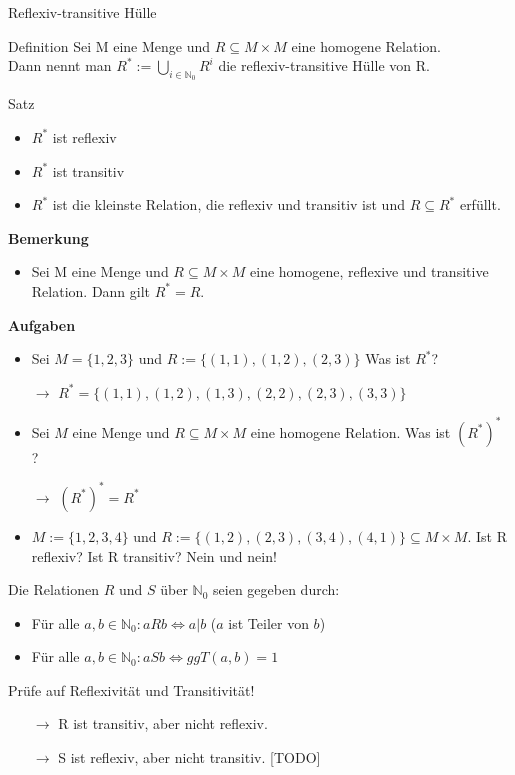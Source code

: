 \begin{frame}{Reflexiv-transitive Hülle}
	\bp\begin{block}{Definition}
		Sei M eine Menge und $R \subseteq M \times M$ eine homogene Relation. \\Dann nennt man $R^* := \bigcup\limits_{i \in \mathbb{N}_0} R^i$ die reflexiv-transitive Hülle von R.
	\end{block}
	\bp\begin{block}{Satz}
		\begin{itemize}
			\item $R^*$ ist reflexiv
			\item $R^*$ ist transitiv
			\item $R^*$ ist die kleinste Relation, die reflexiv und transitiv ist und $R \subseteq R^*$ erfüllt.
		\end{itemize}
	\end{block}
	\bp\textbf{Bemerkung}\\
	\begin{itemize}
		\item Sei M eine Menge und $R\subseteq M \times M$ eine homogene, reflexive und transitive Relation. Dann gilt $R^* = R$.
	\end{itemize}
	
\end{frame}
\begin{frame}
	\textbf{Aufgaben}\\
	\begin{itemize}
		\item Sei $M = \{1, 2, 3\}$ und $R := \{(1,1), (1,2), (2,3)\}$ Was ist $R^*$?
		\pause
		\item[$\rightarrow$] $R^* = \{(1,1), (1,2), (1,3), (2,2), (2,3), (3,3)\}$ 
		\pause
		\item Sei $M$ eine Menge und $R \subseteq M \times M$ eine homogene Relation. Was ist $(R^*)^*$ ?
		\pause
		\item[$\rightarrow$]  $(R^*)^* = R^*$
		\pause
		\item $M := \{1,2,3,4\} \text{ und } R := \{(1,2), (2,3), (3,4), (4,1)\} \subseteq M \times M$. Ist R reflexiv? Ist R transitiv? \pause \hspace{0.3cm} Nein und nein!
	\end{itemize}
\end{frame}

\begin{frame}
	Die Relationen $R$ und $S$ über $\mathbb{N}_0$ seien gegeben durch:
	\begin{itemize}
		\item Für alle $a, b \in \mathbb{N}_0: aRb \Leftrightarrow a|b$ ($a$ ist Teiler von $b$)
		\item Für alle $a, b \in \mathbb{N}_0: aSb \Leftrightarrow ggT(a,b) = 1$ 
	\end{itemize}
	Prüfe auf Reflexivität und Transitivität!
	\pause
	\begin{itemize}
		\item[$\rightarrow$] R ist transitiv, aber nicht reflexiv.
		\pause
		\item[$\rightarrow$] S ist reflexiv, aber nicht transitiv. [TODO]
	\end{itemize}
\end{frame}

